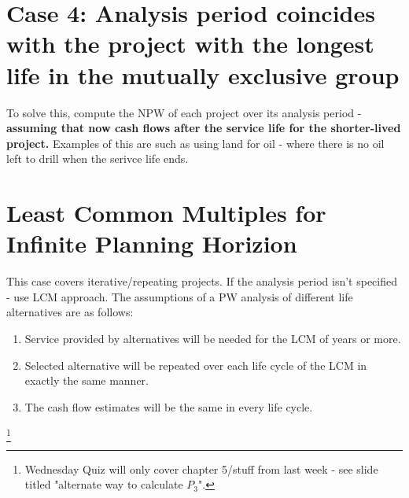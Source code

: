 \documentclass{report} %
\begin{document}
\section*{Case 4: Analysis period coincides with the project with the longest life in the mutually exclusive group}
To solve this, compute the NPW of each project over its analysis period - \textbf{assuming that now cash flows after the service life for the shorter-lived project.}
Examples of this are such as using land for oil - where there is no oil left to drill when the serivce life ends.

\section*{Least Common Multiples for Infinite Planning Horizion}
This case covers iterative/repeating projects.
If the analysis period isn't specified - use LCM approach.
The assumptions of a PW analysis of different life alternatives are as follows:
\begin{enumerate}
    \item Service provided by alternatives will be needed for the LCM of years or more.
    \item Selected alternative will be repeated over each life cycle of the LCM in exactly the same manner.
    \item The cash flow estimates will be the same in every life cycle.
\end{enumerate}
\footnote{Wednesday Quiz will only cover chapter 5/stuff from last week - see slide titled "alternate way to calculate $P_3$".}
\end{document}
